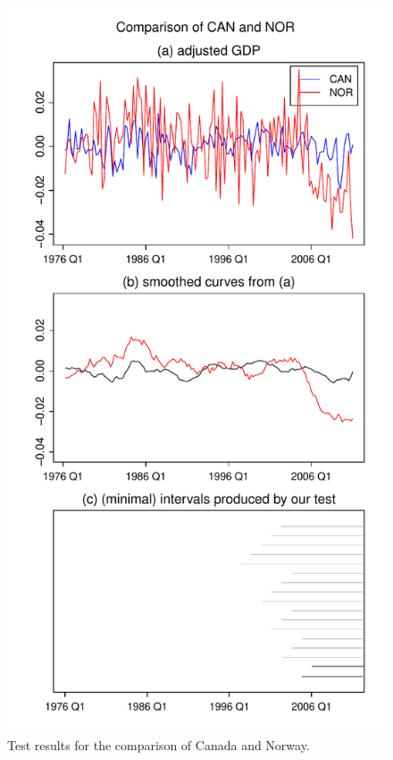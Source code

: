 \documentclass[a4paper,12pt]{article}
\begin{document}
{\begin{figure}[p!]
\begin{minipage}[t]{0.49\textwidth}
\includegraphics[width=\textwidth]{plots/CAN_vs_NOR}
\caption{Test results for the comparison of Canada and Norway.}\label{fig:Canada:Norway}
\end{minipage}
\hspace{0.25cm}

\end{figure}}
\end{document}
